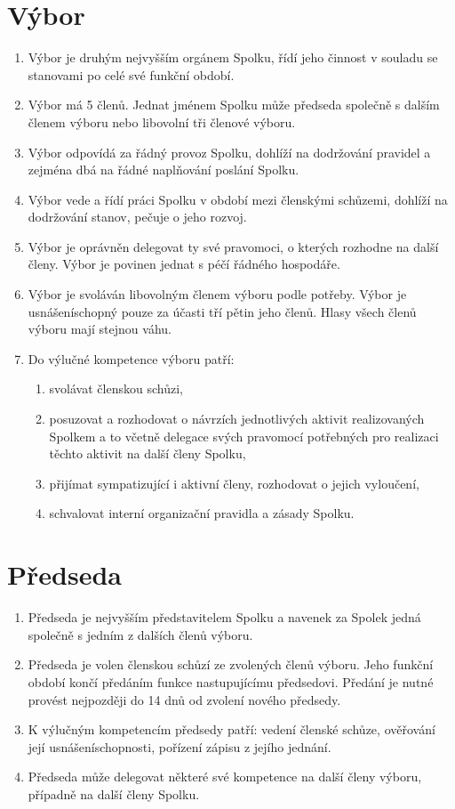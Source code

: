 \documentclass[11pt,a4paper]{article}
\begin{document}
\section{Výbor}
\begin{enumerate}[itemsep=0pt]
    \item Výbor je druhým nejvyšším orgánem Spolku, řídí jeho činnost v souladu 
    se stanovami po celé své funkční období. 
    \item Výbor má 5 členů. Jednat jménem Spolku může 
    předseda společně s dalším členem výboru nebo libovolní tři členové výboru.
    \item Výbor odpovídá za řádný provoz Spolku, dohlíží na dodržování pravidel 
    a zejména dbá na řádné naplňování poslání Spolku.
    \item Výbor vede a řídí práci Spolku v období mezi členskými schůzemi, 
    dohlíží na dodržování stanov, pečuje o jeho rozvoj.
    \item Výbor je oprávněn delegovat ty své pravomoci, o kterých rozhodne na 
    další členy. Výbor je povinen jednat s péčí řádného hospodáře. 
    \item Výbor je svoláván libovolným členem výboru podle potřeby. Výbor je 
    usnášeníschopný pouze za účasti tří pětin jeho členů. Hlasy všech členů 
    výboru mají stejnou váhu.
    \item Do výlučné kompetence výboru patří: 
    \begin{enumerate}[itemsep=0pt,topsep=0pt]
        \item svolávat členskou schůzi, 
        \item posuzovat a rozhodovat o návrzích jednotlivých aktivit 
        realizovaných Spolkem a to včetně delegace svých pravomocí potřebných 
        pro realizaci těchto aktivit na další členy Spolku,
        \item přijímat sympatizující i aktivní členy, rozhodovat o jejich 
        vyloučení,
        \item schvalovat interní organizační pravidla a zásady Spolku.
    \end{enumerate}
\end{enumerate}

\section{Předseda}
\begin{enumerate}[itemsep=0pt]
    \item Předseda je nejvyšším představitelem Spolku a navenek 
    za Spolek jedná společně s jedním z dalších členů výboru.  
    \item Předseda je volen členskou schůzí ze zvolených členů výboru. 
    Jeho funkční období končí předáním funkce nastupujícímu předsedovi. 
    Předání je nutné provést nejpozději do 14 dnů od zvolení nového předsedy. 
    \item K výlučným kompetencím předsedy patří: vedení členské schůze, 
    ověřování její usnášeníschopnosti, pořízení zápisu z jejího jednání.
    \item Předseda může delegovat některé své kompetence na další členy výboru, 
    případně na další členy Spolku.
\end{enumerate}
\end{document}
